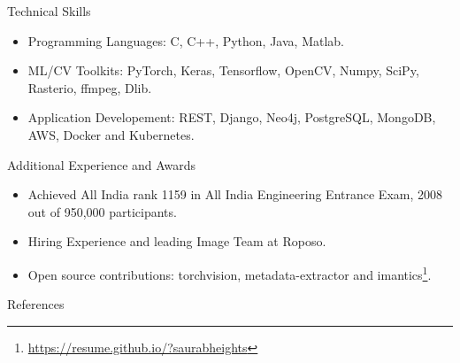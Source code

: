 \documentclass[]{mcdowellcv}
\begin{document}
    \begin{cvsection}{Technical Skills}
        \begin{cvsubsection}{}{}{}    
            \begin{itemize}
                \item Programming Languages: C, C++, Python, Java, Matlab.
                \item ML/CV Toolkits: PyTorch, Keras, Tensorflow, OpenCV, Numpy, SciPy, Rasterio, ffmpeg, Dlib.
                \item Application Developement: REST, Django, Neo4j, PostgreSQL, MongoDB, AWS, Docker and Kubernetes.
            \end{itemize}
        \end{cvsubsection}
    \end{cvsection}
    
    \begin{cvsection}{Additional Experience and Awards}
        \begin{cvsubsection}{}{}{}    
            \begin{itemize}
                \item Achieved All India rank 1159 in All India Engineering Entrance Exam, 2008 out of 950,000 participants.
                \item Hiring Experience and leading Image Team at Roposo.
                \item Open source contributions: torchvision, metadata-extractor and imantics\footnote{\href{https://resume.github.io/?saurabheights}{https://resume.github.io/?saurabheights}}.
            \end{itemize}
        \end{cvsubsection}
    \end{cvsection}
    
        \begin{cvsection}{References}

         \printbibliography[heading=none]

    \end{cvsection}
    
\end{document}
